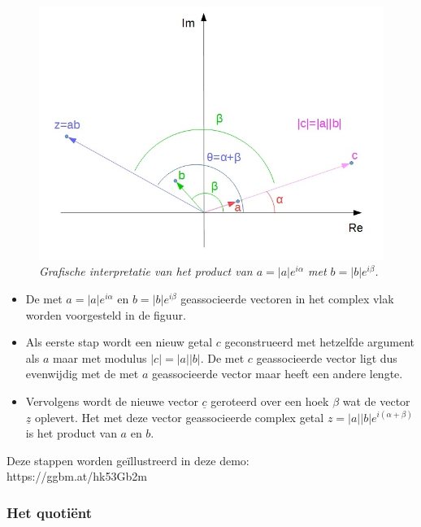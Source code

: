 \begin{figure}[ht]
	\begin{center}
		\includegraphics[scale=0.6]{3_gonio_complexe_getallen/inputs/product-grafisch.jpg}
	\end{center}
	\caption{\it Grafische interpretatie van het product van $a=|a|e^{i\alpha}$ met $b=|b|e^{i\beta}$.}
\end{figure}

\begin{itemize}
	\item De met $a=|a|e^{i\alpha}$ en $b=|b|e^{i\beta}$ geassocieerde vectoren in het complex vlak worden voorgesteld in de figuur.
	\item Als eerste stap wordt een nieuw getal $c$ geconstrueerd met hetzelfde argument als $a$ maar met modulus $|c|=|a||b|$. De met $c$ geassocieerde vector ligt dus evenwijdig met de met $a$ geassocieerde vector maar heeft een andere lengte.
	\item Vervolgens wordt de nieuwe vector $\underline{c}$ geroteerd over een hoek $\beta$ wat de vector $\underline{z}$ oplevert. Het met deze vector geassocieerde complex getal $z=|a||b|e^{i(\alpha + \beta)}$ is het product van $a$ en $b$.
\end{itemize}

Deze stappen worden ge\"{i}llustreerd in deze demo:\\

https://ggbm.at/hk53Gb2m      \\

\subsubsection{Het quoti\"{e}nt}

